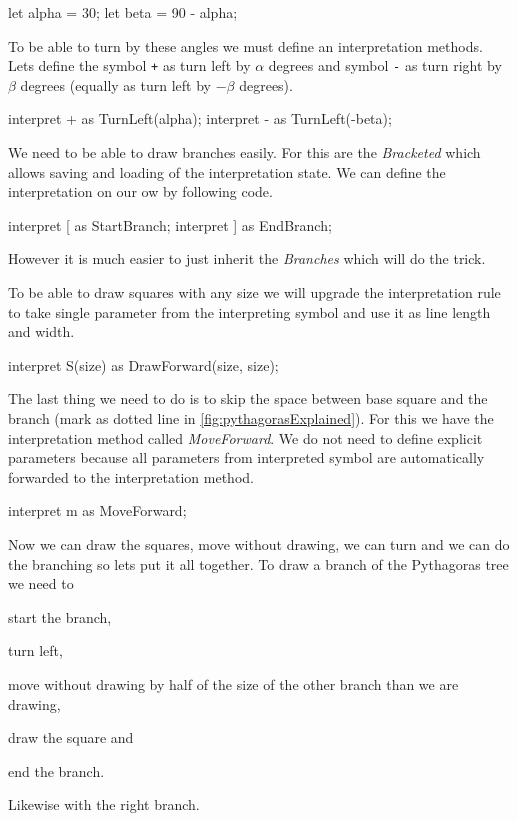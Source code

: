 \begin{Lsystem}
let alpha = 30;
let beta = 90 - alpha;
\end{Lsystem}

To be able to turn by these angles we must define an interpretation methods.
Lets define the symbol \texttt{+} as turn left by $\alpha$ degrees and symbol \texttt{-} as turn right by $\beta$ degrees (equally as turn left by $-\beta$ degrees).

\begin{Lsystem}
interpret + as TurnLeft(alpha);
interpret - as TurnLeft(-beta);
\end{Lsystem}

We need to be able to draw branches easily.
For this are the \emph{Bracketed \lsystems} which allows saving and loading of the interpretation state.
We can define the interpretation on our ow by following code.

\begin{Lsystem}
interpret [ as StartBranch;
interpret ] as EndBranch;
\end{Lsystem}

However it is much easier to just inherit the \emph{Branches} \lsystem which will do the trick.

\begin{Lsystem}
lsystem PythagorasTree extends Branches {
\end{Lsystem}

To be able to draw squares with any size we will upgrade the interpretation rule to take single parameter from the interpreting symbol and use it as line length and width.

\begin{Lsystem}
interpret S(size) as DrawForward(size, size);
\end{Lsystem}

The last thing we need to do is to skip the space between base square and the branch (mark as dotted line in \autoref{fig:pythagorasExplained}).
For this we have the interpretation method called \emph{MoveForward}.
We do not need to define explicit parameters because all parameters from interpreted symbol are automatically forwarded to the interpretation method.

\begin{Lsystem}
interpret m as MoveForward;
\end{Lsystem}


Now we can draw the squares, move without drawing, we can turn and we can do the branching so lets put it all together.
To draw a branch of the Pythagoras tree we need to
	\begin{inparaenum}[{\itshape a})]
		\item start the branch,
		\item turn left,
		\item move without drawing by half of the size of the other branch than we are drawing,
		\item draw the square and
		\item end the branch.
	\end{inparaenum}
Likewise with the right branch.

